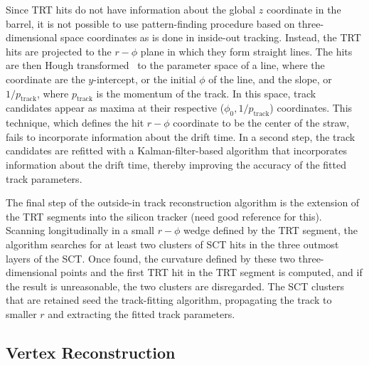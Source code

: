 Since TRT hits do not have information about the global $z$
coordinate in the barrel, it is not possible to use pattern-finding
procedure based on three-dimensional space coordinates as is done in
inside-out tracking. Instead, the TRT hits are projected to the
$r-\phi$ plane in which they form straight lines. The hits are then Hough
transformed~\cite{bib:Duda:1972uht} to the parameter
space of a line, where the coordinate are the $y$-intercept, or the
initial $\phi$ of the line, and the slope, or $1/p_{\textrm{track}}$,
where $p_{\textrm{track}}$ is the momentum of the track. In this
space, track candidates appear as maxima at their respective
($\phi_0,1/p_{\textrm{track}}$) coordinates. This technique, which
defines the hit $r-\phi$ coordinate to be the center of the straw,
fails to incorporate information about the drift time. In a second
step, the track candidates are refitted with a Kalman-filter-based
algorithm that incorporates information about the drift time, thereby
improving the accuracy of the fitted track parameters. 

The final step of the outside-in track reconstruction algorithm is the
extension of the TRT segments into the silicon tracker (need good
reference for this). Scanning longitudinally in a small $r-\phi$ wedge
defined by the TRT segment, the algorithm searches for at least two
clusters of SCT hits in the three outmost layers of the
SCT. Once found, the curvature defined by these two three-dimensional
points and the first TRT hit in the TRT segment is computed, and if
the result is unreasonable, the two clusters are disregarded. The SCT
clusters that are retained seed the track-fitting algorithm,
propagating the track to smaller $r$ and extracting the fitted track
parameters. 

\subsection{Vertex Reconstruction}

